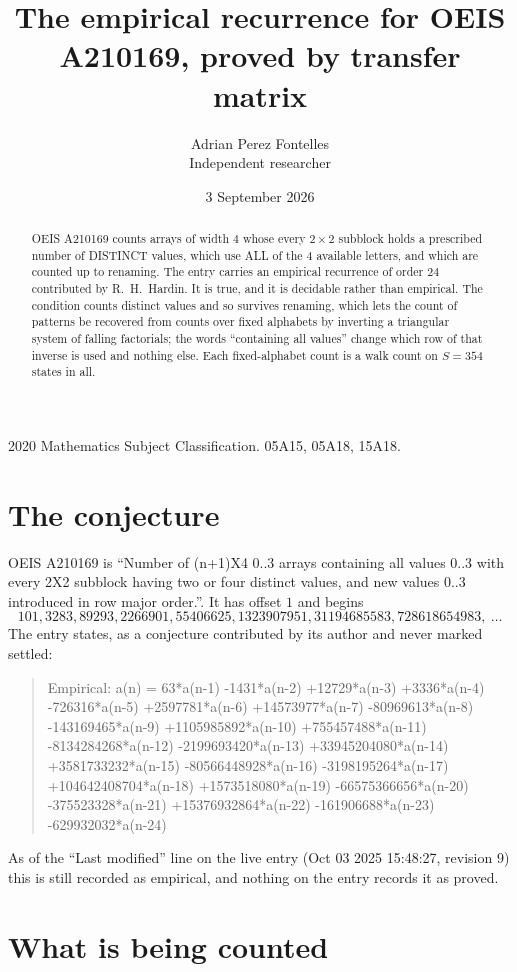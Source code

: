 \documentclass[11pt,a4paper]{article}
\title{The empirical recurrence for OEIS A210169, proved by transfer matrix}
\author{Adrian Perez Fontelles\\ \small Independent researcher}
\date{3 September 2026}
\theoremstyle{plain}
\theoremstyle{definition}
\begin{document}
\maketitle

\begin{abstract}
OEIS A210169 counts arrays of width $4$ whose every $2\times2$ subblock holds a
prescribed number of DISTINCT values, which use ALL of the $4$ available letters, and which
are counted up to renaming. The entry carries an empirical recurrence of order $24$
contributed by R.~H.~Hardin. It is true, and it is decidable rather than empirical. The
condition counts distinct values and so survives renaming, which lets the count of patterns be
recovered from counts over fixed alphabets by inverting a triangular system of falling
factorials; the words ``containing all values'' change which row of that inverse is used and
nothing else. Each fixed-alphabet count is a walk count on $S=354$ states in all.
\end{abstract}

\noindent\small 2020 Mathematics Subject Classification. 05A15, 05A18, 15A18.\normalsize

\section{The conjecture}

OEIS A210169 is ``Number of (n+1)X4 0..3 arrays containing all values 0..3 with every 2X2 subblock having two or four distinct values, and new values 0..3 introduced in row major order.''. It has offset $1$ and begins
\[
101, 3283, 89293, 2266901, 55406625, 1323907951, 31194685583, 728618654983,\ \dots
\]
The entry states, as a conjecture contributed by its author and never marked settled:
\begin{quote}
Empirical: a(n) = 63*a(n-1) -1431*a(n-2) +12729*a(n-3) +3336*a(n-4) -726316*a(n-5) +2597781*a(n-6) +14573977*a(n-7) -80969613*a(n-8) -143169465*a(n-9) +1105985892*a(n-10) +755457488*a(n-11) -8134284268*a(n-12) -2199693420*a(n-13) +33945204080*a(n-14) +3581733232*a(n-15) -80566448928*a(n-16) -3198195264*a(n-17) +104642408704*a(n-18) +1573518080*a(n-19) -66575366656*a(n-20) -375523328*a(n-21) +15376932864*a(n-22) -161906688*a(n-23) -629932032*a(n-24)
\end{quote}
As of the ``Last modified'' line on the live entry (Oct 03 2025 15:48:27, revision 9) this is still
recorded as empirical, and nothing on the entry records it as proved.

\section{What is being counted}
\end{document}
